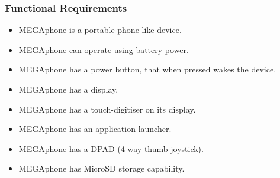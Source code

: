         \subsubsection{Functional Requirements}
        \begin{itemize}
        \item MEGAphone is a portable phone-like device.
        \item MEGAphone can operate using battery power.
        \item MEGAphone has a power button, that when pressed wakes the device.
        \item MEGAphone has a display.
        \item MEGAphone has a touch-digitiser on its display.
        \item MEGAphone has an application launcher.
        \item MEGAphone has a DPAD (4-way thumb joystick).
	\item MEGAphone has MicroSD storage capability.
        \end{itemize}

